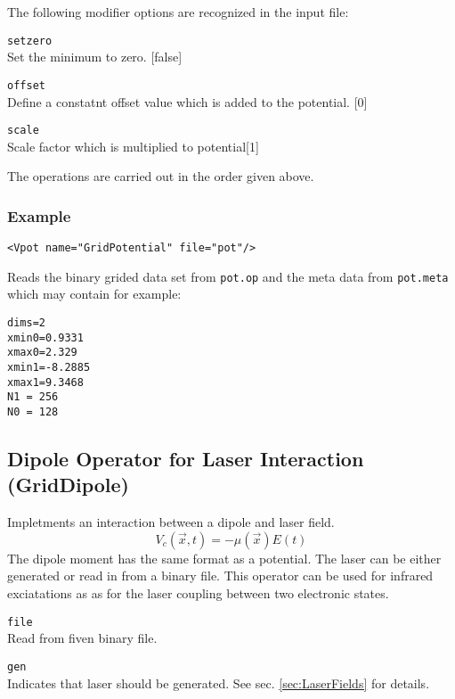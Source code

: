 \documentclass[a4paper,12pt]{scrbook}
\newcommand{\option}[2]{\item \texttt{#1}\\ #2}
\begin{document}
The following modifier options are recognized in the input file:
\begin{options}
 \option{setzero}{Set the minimum to zero. [false]}
 \option{offset}{Define a constatnt offset value which is added to the potential. [0]}
 \option{scale}{Scale factor which is multiplied to potential[1]}
\end{options}
The operations are carried out in the order given above.

\subsubsection*{Example}
\begin{verbatim}
<Vpot name="GridPotential" file="pot"/>
\end{verbatim}
Reads the binary grided data set from \verb|pot.op| and the meta data from \verb|pot.meta| which may contain for example:
\begin{verbatim}
dims=2
xmin0=0.9331
xmax0=2.329
xmin1=-8.2885
xmax1=9.3468
N1 = 256
N0 = 128
\end{verbatim}

\subsection{Dipole Operator for Laser Interaction (GridDipole)}
Impletments an interaction between a dipole and laser field.
\begin{equation}
 V_c(\vec{x},t) = -\mu(\vec{x}) E(t)
\end{equation}
The dipole moment has the same format as a potential. The laser
can be either generated or read in from a binary file.
This operator can be used for infrared exciatations as as for
the laser coupling between two electronic states.

\begin{options}
 \option{file}{Read from fiven binary file.}
 \option{gen}{Indicates that laser should be generated. See sec. \ref{sec:LaserFields} for details.}
\end{options}
\end{document}
